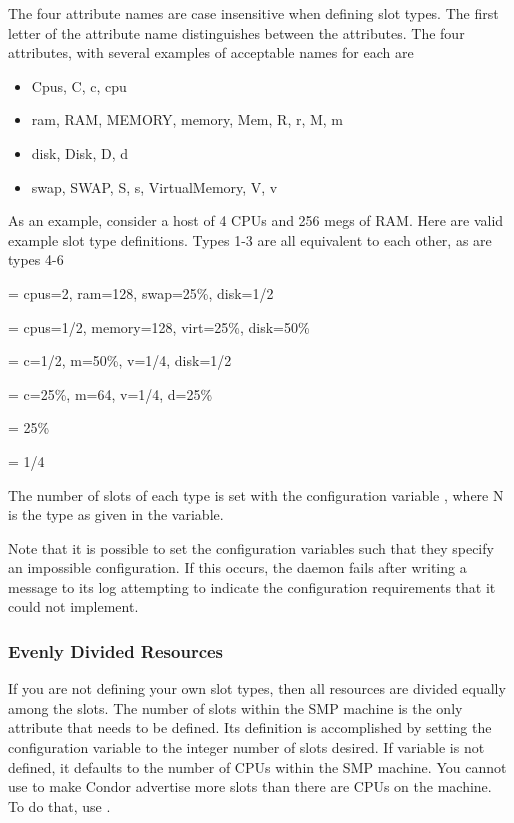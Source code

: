 The four attribute names are case insensitive when defining slot types.
The first letter of the attribute name distinguishes between
the attributes.
The four attributes, with several examples of acceptable names for
each are
\begin{itemize}
  \item Cpus, C, c, cpu 
  \item ram, RAM, MEMORY, memory, Mem, R, r, M, m
  \item disk, Disk, D, d
  \item swap, SWAP, S, s, VirtualMemory, V, v
\end{itemize}

As an example, consider a
host of 4 CPUs and 256 megs of RAM.
Here are valid example slot type definitions. 
Types 1-3 are all equivalent to each other, as are types 4-6

 = cpus=2, ram=128, swap=25\%, disk=1/2

 = cpus=1/2, memory=128, virt=25\%, disk=50\%

 = c=1/2, m=50\%, v=1/4, disk=1/2

 = c=25\%, m=64, v=1/4, d=25\%

 = 25\%

 = 1/4


The number of slots of each type is set with the
configuration variable
,
where N is the type as given in the
variable.

Note that it is possible to set the configuration variables such
that they specify an impossible configuration.
If this occurs, the  daemon fails after writing
a message to its log attempting to indicate the configuration
requirements that it could not implement.

\subsubsection{\label{sec:Config-Slot-Number}
Evenly Divided Resources}

If you are not defining your own slot types, then all resources
are divided equally among the slots.
The number of slots within the SMP machine is the only attribute
that needs to be defined.
Its definition is accomplished by setting the configuration
variable  to the
integer number of slots desired.
If variable  is not defined,
it defaults to the number of CPUs within the SMP machine.
You cannot use  to make Condor advertise more
slots than there are CPUs on the machine.
To do that, use .

